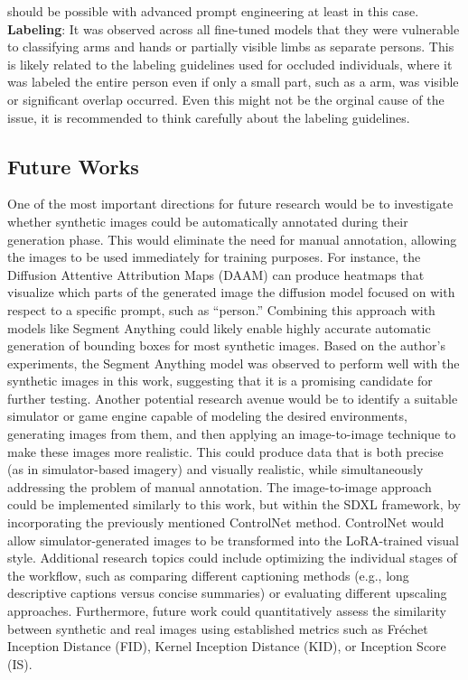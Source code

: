 should be possible with advanced prompt engineering at least in this case. \textbf{Labeling}: It was observed across all fine-tuned models that they were vulnerable to classifying arms and hands or partially visible limbs as separate persons. This is likely related to the labeling guidelines used for occluded individuals, where it was labeled the entire person even if only a small part, such as a arm, was visible or significant overlap occurred. Even this might not be the orginal cause of the issue, it is recommended to think carefully about the labeling guidelines. \subsection{Future Works} One of the most important directions for future research would be to investigate whether synthetic images could be automatically annotated during their generation phase. This would eliminate the need for manual annotation, allowing the images to be used immediately for training purposes. For instance, the Diffusion Attentive Attribution Maps (DAAM) \cite{tang2022daaminterpretingstablediffusion} can produce heatmaps that visualize which parts of the generated image the diffusion model focused on with respect to a specific prompt, such as “person.” Combining this approach with models like Segment Anything \cite{kirillov2023segment} could likely enable highly accurate automatic generation of bounding boxes for most synthetic images. Based on the author's experiments, the Segment Anything model was observed to perform well with the synthetic images in this work, suggesting that it is a promising candidate for further testing. Another potential research avenue would be to identify a suitable simulator or game engine capable of modeling the desired environments, generating images from them, and then applying an image-to-image technique to make these images more realistic. This could produce data that is both precise (as in simulator-based imagery) and visually realistic, while simultaneously addressing the problem of manual annotation. The image-to-image approach could be implemented similarly to this work, but within the SDXL framework, by incorporating the previously mentioned ControlNet method. ControlNet would allow simulator-generated images to be transformed into the LoRA-trained visual style. Additional research topics could include optimizing the individual stages of the workflow, such as comparing different captioning methods (e.g., long descriptive captions versus concise summaries) or evaluating different upscaling approaches. Furthermore, future work could quantitatively assess the similarity between synthetic and real images using established metrics such as Fréchet Inception Distance (FID), Kernel Inception Distance (KID), or Inception Score (IS).

